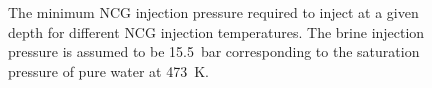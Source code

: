         \begin{figure}[H]
            \centering
            
            \caption[The minimum \ac{NCG} injection pressure required to inject at a given depth for different \ac{NCG} injection temperatures.]{The minimum \ac{NCG} injection pressure required to inject at a given depth for different \ac{NCG} injection temperatures. The brine injection pressure is assumed to be \qty{15.5}{\bar} corresponding to the saturation pressure of pure water at \qty{473}{\K}.}
            \label{fig:prosim_NCG_Reinjection_Pinj_v_Depth_v_Tinj}
        \end{figure}

        



